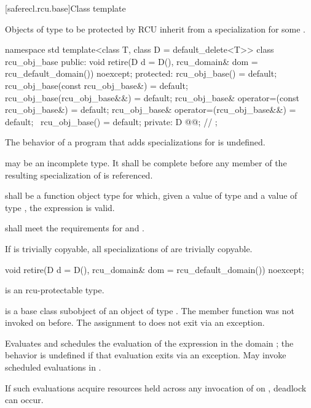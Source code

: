 [saferecl.rcu.base]{Class template }

\pnum
Objects of type  to be protected by RCU inherit from
a specialization  for some .

\begin{codeblock}
namespace std {
  template<class T, class D = default_delete<T>>
  class rcu_obj_base {
  public:
    void retire(D d = D(), rcu_domain& dom = rcu_default_domain()) noexcept;
  protected:
    rcu_obj_base() = default;
    rcu_obj_base(const rcu_obj_base&) = default;
    rcu_obj_base(rcu_obj_base&&) = default;
    rcu_obj_base& operator=(const rcu_obj_base&) = default;
    rcu_obj_base& operator=(rcu_obj_base&&) = default;
    ~rcu_obj_base() = default;
  private:
    D @@;            // \expos
  };
}
\end{codeblock}

\pnum
The behavior of a program that adds specializations for 
is undefined.

\pnum
{} may be an incomplete type.
It shall be complete before any member of the resulting specialization of
 is referenced.

\pnum
{} shall be a
function object type for which,
given a value  of type  and
a value  of type ,
the expression  is valid.

\pnum
{} shall meet the requirements for
 and .

\pnum
If  is trivially copyable,
all specializations of  are trivially copyable.

\begin{itemdecl}
void retire(D d = D(), rcu_domain& dom = rcu_default_domain()) noexcept;
\end{itemdecl}

\begin{itemdescr}
\pnum
\mandates
{} is an rcu-protectable type.

\pnum
\expects
{} is
a base class subobject of an object  of type .
The member function 
was not invoked on  before.
The assignment to  does not exit via an exception.

\pnum
\effects
Evaluates  and
schedules the evaluation of
the expression 
in the domain ;
the behavior is undefined if that evaluation exits via an exception.
May invoke scheduled evaluations in .

\begin{note}
If such evaluations acquire resources held across any invocation of
 on , deadlock can occur.
\end{note}
\end{itemdescr}

